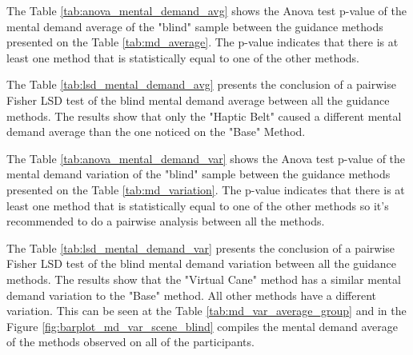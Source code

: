 %

\begin{table}[!htb]
    \begin{minipage}{.45\linewidth}
        
    \end{minipage}
    \hfill
    \begin{minipage}{.45\linewidth}
        \vspace{-2.75cm}
        
    \end{minipage}
\end{table}

The Table \ref{tab:anova_mental_demand_avg} shows the Anova test p-value of the mental demand average of the "blind" sample between the guidance methods presented on the Table \ref{tab:md_average}. The p-value indicates that there is at least one method that is statistically equal to one of the other methods.



The Table \ref{tab:lsd_mental_demand_avg} presents the conclusion of a pairwise Fisher LSD test of the blind mental demand average between all the guidance methods. The results show that only the "Haptic Belt" caused a different mental demand average than the one noticed on the "Base" Method.



The Table \ref{tab:anova_mental_demand_var} shows the Anova test p-value of the mental demand variation of the "blind" sample between the guidance methods presented on the Table \ref{tab:md_variation}. The p-value indicates that there is at least one method that is statistically equal to one of the other methods so it's recommended to do a pairwise analysis between all the methods.





The Table \ref{tab:lsd_mental_demand_var} presents the conclusion of a pairwise Fisher LSD test of the blind mental demand variation between all the guidance methods. The results show that the "Virtual Cane" method has a similar mental demand variation to the "Base" method. All other methods have a different variation. This can be seen at the Table \ref{tab:md_var_average_group} and in the Figure \ref{fig:barplot_md_var_scene_blind} compiles the mental demand average of the methods observed on all of the participants.

